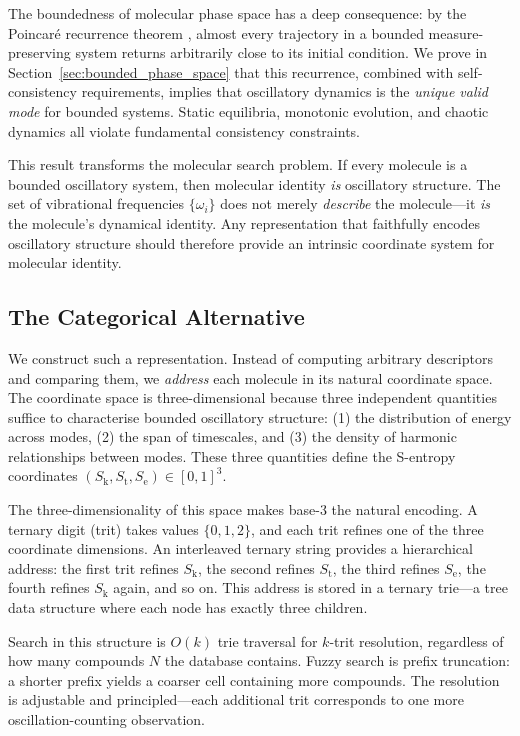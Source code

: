 \documentclass[11pt,twocolumn,a4paper]{article}
\theoremstyle{definition}
\theoremstyle{remark}
\newcommand{\Sk}{S_{\mathrm{k}}}
\newcommand{\St}{S_{\mathrm{t}}}
\newcommand{\Se}{S_{\mathrm{e}}}
\begin{document}
The boundedness of molecular phase space has a deep consequence: by the Poincar\'e recurrence theorem \citep{poincare1890}, almost every trajectory in a bounded measure-preserving system returns arbitrarily close to its initial condition. We prove in Section~\ref{sec:bounded_phase_space} that this recurrence, combined with self-consistency requirements, implies that oscillatory dynamics is the \emph{unique valid mode} for bounded systems. Static equilibria, monotonic evolution, and chaotic dynamics all violate fundamental consistency constraints.

This result transforms the molecular search problem. If every molecule is a bounded oscillatory system, then molecular identity \emph{is} oscillatory structure. The set of vibrational frequencies $\{\omega_i\}$ does not merely \emph{describe} the molecule---it \emph{is} the molecule's dynamical identity. Any representation that faithfully encodes oscillatory structure should therefore provide an intrinsic coordinate system for molecular identity.

\subsection{The Categorical Alternative}

We construct such a representation. Instead of computing arbitrary descriptors and comparing them, we \emph{address} each molecule in its natural coordinate space. The coordinate space is three-dimensional because three independent quantities suffice to characterise bounded oscillatory structure: (1) the distribution of energy across modes, (2) the span of timescales, and (3) the density of harmonic relationships between modes. These three quantities define the S-entropy coordinates $(\Sk, \St, \Se) \in [0,1]^3$.

The three-dimensionality of this space makes base-3 the natural encoding. A ternary digit (trit) takes values $\{0, 1, 2\}$, and each trit refines one of the three coordinate dimensions. An interleaved ternary string provides a hierarchical address: the first trit refines $\Sk$, the second refines $\St$, the third refines $\Se$, the fourth refines $\Sk$ again, and so on. This address is stored in a ternary trie---a tree data structure where each node has exactly three children.

Search in this structure is $O(k)$ trie traversal for $k$-trit resolution, regardless of how many compounds $N$ the database contains. Fuzzy search is prefix truncation: a shorter prefix yields a coarser cell containing more compounds. The resolution is adjustable and principled---each additional trit corresponds to one more oscillation-counting observation.
\end{document}
